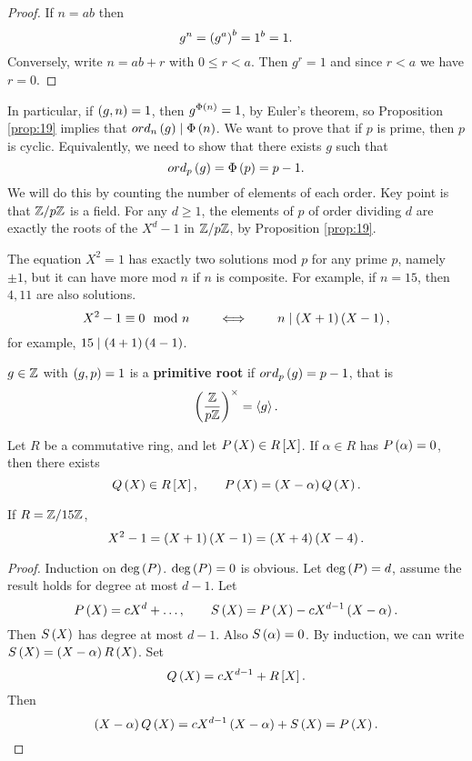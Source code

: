 \begin{proof}
If $ n = ab $ then
$$ g^n = \br{g^a}^b = 1^b = 1. $$
Conversely, write $ n = ab + r $ with $ 0 \le r < a $. Then $ g^r = 1 $ and since $ r < a $ we have $ r = 0 $.
\end{proof}

In particular, if $ \br{g, n} = 1 $, then $ g^{\Phi\br{n}} = 1 $, by Euler's theorem, so Proposition \ref{prop:19} implies that $ ord_n\br{g} \mid \Phi\br{n} $. We want to prove that if $ p $ is prime, then $ \unit{p} $ is cyclic. Equivalently, we need to show that there exists $ g $ such that
$$ ord_p\br{g} = \Phi\br{p} = p - 1. $$
We will do this by counting the number of elements of each order. Key point is that $ \mathbb{Z} / p\mathbb{Z} $ is a field. For any $ d \ge 1 $, the elements of $ \unit{p} $ of order dividing $ d $ are exactly the roots of the $ X^d - 1 $ in $ \mathbb{Z} / p\mathbb{Z} $, by Proposition \ref{prop:19}.

\begin{example*}
The equation $ X^2 = 1 $ has exactly two solutions mod $ p $ for any prime $ p $, namely $ \pm 1 $, but it can have more mod $ n $ if $ n $ is composite. For example, if $ n = 15 $, then $ 4, 11 $ are also solutions.
$$ X^2 - 1 \equiv 0 \mod n \qquad \iff \qquad n \mid \br{X + 1}\br{X - 1}, $$
for example, $ 15 \mid \br{4 + 1}\br{4 - 1} $.
\end{example*}

\begin{definition}
$ g \in \mathbb{Z} $ with $ \br{g, p} = 1 $ is a \textbf{primitive root} if $ ord_p\br{g} = p - 1 $, that is
$$ \Unit{p} = \abr{g}. $$
\end{definition}

\begin{lemma}
\label{lem:21}
Let $ R $ be a commutative ring, and let $ P\br{X} \in R\sbr{X} $. If $ \alpha \in R $ has $ P\br{\alpha} = 0 $, then there exists
$$ Q\br{X} \in R\sbr{X}, \qquad P\br{X} = \br{X - \alpha}Q\br{X}. $$
\end{lemma}

\begin{example*}
If $ R = \mathbb{Z} / 15\mathbb{Z} $,
$$ X^2 - 1 = \br{X + 1}\br{X - 1} = \br{X + 4}\br{X - 4}. $$
\end{example*}

\begin{proof}
Induction on $ \deg\br{P} $. $ \deg\br{P} = 0 $ is obvious. Let $ \deg\br{P} = d $, assume the result holds for degree at most $ d - 1 $. Let
$$ P\br{X} = cX^d + \dots, \qquad S\br{X} = P\br{X} - cX^{d - 1}\br{X - \alpha}. $$
Then $ S\br{X} $ has degree at most $ d - 1 $. Also $ S\br{\alpha} = 0 $. By induction, we can write $ S\br{X} = \br{X - \alpha}R\br{X} $. Set
$$ Q\br{X} = cX^{d - 1} + R\sbr{X}. $$
Then
$$ \br{X - \alpha}Q\br{X} = cX^{d - 1}\br{X - \alpha} + S\br{X} = P\br{X}. $$
\end{proof}


